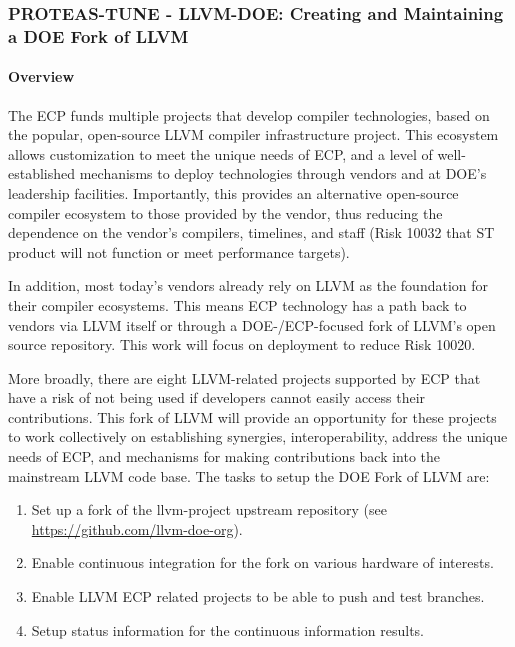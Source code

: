\subsubsection{ PROTEAS-TUNE - LLVM-DOE: Creating and Maintaining a DOE Fork of LLVM}\label{s:llvm-doe}

\paragraph{Overview}

The ECP funds multiple projects that develop compiler technologies, based on the
popular, open-source LLVM compiler infrastructure project. This ecosystem allows
customization to meet the unique needs of ECP, and a level of well-established
mechanisms to deploy technologies through vendors and at DOE’s leadership
facilities. Importantly, this provides an alternative open-source compiler
ecosystem to those provided by the vendor, thus reducing the dependence on the
vendor’s compilers, timelines, and staff (Risk 10032 that ST product will not
function or meet performance targets).

In addition, most today’s vendors already rely on LLVM as the foundation for
their compiler ecosystems. This means ECP technology has a path back to vendors
via LLVM itself or through a DOE-/ECP-focused fork of LLVM’s open source
repository. This work will focus on deployment to reduce Risk 10020.

More broadly, there are eight LLVM-related projects supported by ECP that have
a risk of not being used if developers cannot easily access their contributions.
This fork of LLVM will provide an opportunity for these projects to work
collectively on establishing synergies, interoperability, address the unique
needs of ECP, and mechanisms for making contributions back into the mainstream
LLVM code base. The tasks to setup the DOE Fork of LLVM are:

\begin{enumerate}

\item Set up a fork of the llvm-project upstream repository (see \url{https://github.com/llvm-doe-org}).

\item Enable continuous integration for the fork on various hardware of       interests.

\item Enable LLVM ECP related projects to be able to push and test branches.

\item Setup status information for the continuous information results.

\end{enumerate}


